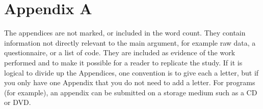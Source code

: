 \section*{Appendix A}
The appendices are not marked, or included in the word count.
They contain information not directly relevant to the main argument, for example raw data, a questionnaire, or a list of code. They are included as evidence of the work performed and to make it possible for a reader to replicate the study. If it is logical to divide up the Appendices, one convention is to give each a letter, but if you only have one Appendix that you do not need to add a letter.
For programs (for example), an appendix can be submitted on a storage medium such as a CD or DVD.
